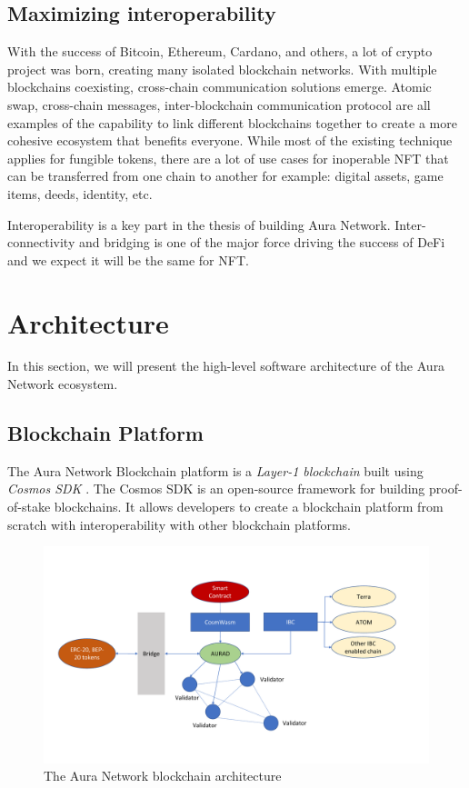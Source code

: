 \documentclass[11pt, titlepage]{article}
\begin{document}
\subsection{Maximizing interoperability}

With the success of Bitcoin, Ethereum, Cardano, and others, a lot of crypto project was born, creating many isolated blockchain networks. With multiple blockchains coexisting, cross-chain communication solutions emerge. Atomic swap, cross-chain messages, inter-blockchain communication protocol are all examples of the capability to link different blockchains together to create a more cohesive ecosystem that benefits everyone. While most of the existing technique applies for fungible tokens, there are a lot of use cases for inoperable NFT that can be transferred from one chain to another for example: digital assets, game items, deeds, identity, etc.

Interoperability is a key part in the thesis of building Aura Network. Inter-connectivity and bridging is one of the major force driving the success of DeFi and we expect it will be the same for NFT.

\section{Architecture}
In this section, we will present the high-level software architecture of the Aura Network ecosystem. 

\subsection{Blockchain Platform}
The Aura Network Blockchain platform is a \emph{Layer-1 blockchain} built using \emph{Cosmos SDK} \cite{kwon2019cosmos}. The Cosmos SDK is an open-source framework for building proof-of-stake blockchains. It allows developers to create a blockchain platform from scratch with interoperability with other blockchain platforms. 

\begin{figure}[ht]
\includegraphics[width=\textwidth, trim={0 2cm 2cm 0}, clip]{img/architecture.pdf}
\centering
\caption{The Aura Network blockchain architecture}
\label{fig:architecture}
\end{figure}
\end{document}
